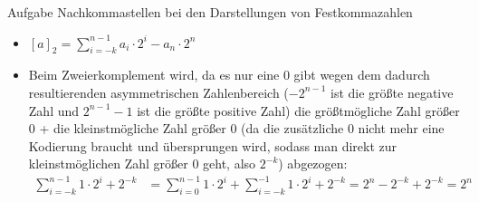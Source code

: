 \begin{frame}[allowframebreaks]{Aufgabe \thesection}{Nachkommastellen bei den Darstellungen von Festkommazahlen}
    \begin{solution}
        \begin{itemize}
            \item $\displaystyle [a]_{2}=\textstyle{\sum_{i=-k}^{n-1}a_{i}\cdot2^{i}-a_{n}\cdot2^{n}}$
            \item Beim \alert{Zweierkomplement} wird, da es nur eine $0$ gibt wegen dem dadurch resultierenden asymmetrischen Zahlenbereich ($-2^{n-1}$ ist die größte negative Zahl und $2^{n-1}-1$ ist die größte positive Zahl) die größtmögliche Zahl größer $0$ + die kleinstmögliche Zahl größer $0$ (da die zusätzliche $0$ nicht mehr eine Kodierung braucht und übersprungen wird, sodass man direkt zur kleinstmöglichen Zahl größer $0$ geht, also $2^{-k}$) abgezogen:
            \begin{align*}
            \sum_{i=-k}^{n-1}1\cdot2^{i} + 2^{-k} &= \sum_{i=0}^{n-1}1\cdot2^{i} + \sum_{i=-k}^{-1}1\cdot2^{i} + 2^{-k} = 2^n-2^{-k} + 2^{-k} = 2^n
            \end{align*}
        \end{itemize}
    \end{solution}
\end{frame}

